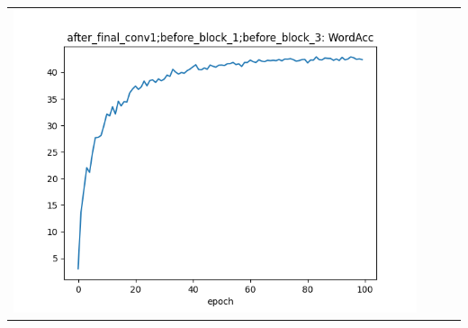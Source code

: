 \begin{longtable}{cccc}
\includegraphics[scale=0.2]{./images/mixup_position/after_final_conv1;before_block_1;before_block_3_WordAcc.png}\\

\end{longtable}
